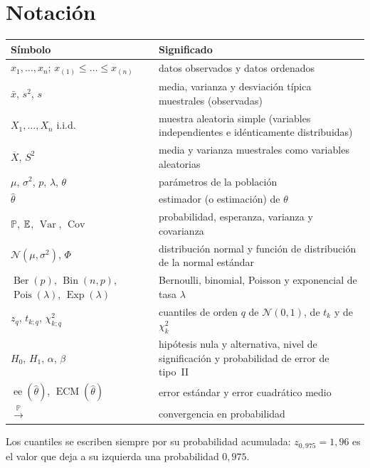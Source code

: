 \documentclass[11pt,a4paper,twoside,openany]{book}
\newcommand{\PP}{\mathbb{P}}
\DeclareMathOperator{\Var}{Var}
\DeclareMathOperator{\Cov}{Cov}
\DeclareMathOperator{\ECM}{ECM}
\DeclareMathOperator{\ee}{ee}
\DeclareMathOperator{\Bin}{Bin}
\DeclareMathOperator{\Ber}{Ber}
\DeclareMathOperator{\Pois}{Pois}
\DeclareMathOperator{\Expo}{Exp}
\newcommand{\Nor}{\mathcal{N}}
\newcommand{\Xbar}{\overline{X}}
\newcommand{\xbar}{\bar{x}}
\newcommand{\iid}{i.i.d.}
\newcommand{\convp}{\xrightarrow{\;\PP\;}}
\begin{document}
\section*{Notación}
\begin{center}
\small
\begin{tabularx}{\textwidth}{@{}>{\raggedright\arraybackslash}p{5.2cm}X@{}}
\toprule
Símbolo & Significado \\
\midrule
$x_1,\dots,x_n$; $x_{(1)}\le\dots\le x_{(n)}$ & datos observados y datos ordenados \\
$\xbar$, $s^{2}$, $s$ & media, varianza y desviación típica muestrales (observadas) \\
$X_1,\dots,X_n$ \iid & muestra aleatoria simple (variables independientes e idénticamente distribuidas) \\
$\Xbar$, $S^{2}$ & media y varianza muestrales como variables aleatorias \\
$\mu$, $\sigma^{2}$, $p$, $\lambda$, $\theta$ & parámetros de la población \\
$\widehat\theta$ & estimador (o estimación) de $\theta$ \\
$\PP$, $\mathbb{E}$, $\Var$, $\Cov$ & probabilidad, esperanza, varianza y covarianza \\
$\Nor(\mu,\sigma^{2})$, $\Phi$ & distribución normal y función de distribución de la normal estándar \\
$\Ber(p)$, $\Bin(n,p)$, $\Pois(\lambda)$, $\Expo(\lambda)$ & Bernoulli, binomial, Poisson y exponencial de tasa $\lambda$ \\
$z_{q}$, $t_{k;q}$, $\chi^{2}_{k;q}$ & cuantiles de orden $q$ de $\Nor(0,1)$, de $t_k$ y de $\chi^{2}_k$ \\
$H_0$, $H_1$, $\alpha$, $\beta$ & hipótesis nula y alternativa, nivel de significación y probabilidad de error de tipo~II \\
$\ee(\widehat\theta)$, $\ECM(\widehat\theta)$ & error estándar y error cuadrático medio \\
$\convp$ & convergencia en probabilidad \\
\bottomrule
\end{tabularx}
\end{center}
Los cuantiles se escriben siempre por su probabilidad acumulada: $z_{0{,}975}=1{,}96$ es el valor que deja a su izquierda una probabilidad $0{,}975$.


\tableofcontents

\mainmatter







\backmatter

\end{document}
